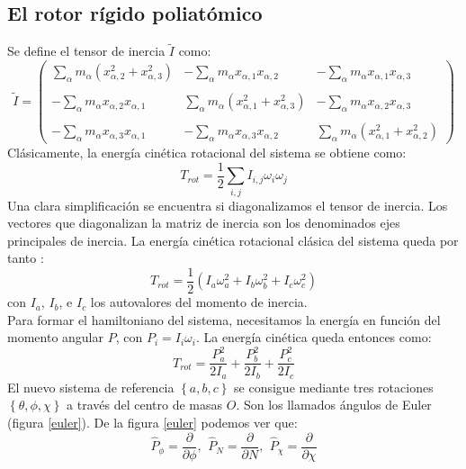 \documentclass[a4paper]{article}
\begin{document}
\subsection{El rotor rígido poliatómico}
Se define el tensor de inercia $\tilde{I}$ como:
\begin{equation}
\tilde{I}=\begin{pmatrix}
\sum_{\alpha}m_{\alpha}\left(x^2_{\alpha,2}+x^2_{\alpha,3}\right) & -\sum_{\alpha}m_{\alpha}x_{\alpha,1}x_{\alpha,2} & -\sum_{\alpha}m_{\alpha}x_{\alpha,1}x_{\alpha,3} \\\\
-\sum_{\alpha}m_{\alpha}x_{\alpha,2}x_{\alpha,1} & \sum_{\alpha}m_{\alpha}\left(x^2_{\alpha,1}+x^2_{\alpha,3}\right) &-\sum_{\alpha}m_{\alpha}x_{\alpha,2}x_{\alpha,3} \\\\
-\sum_{\alpha}m_{\alpha}x_{\alpha,3}x_{\alpha,1} & -\sum_{\alpha}m_{\alpha}x_{\alpha,3}x_{\alpha,2} & \sum_{\alpha}m_{\alpha}\left(x^2_{\alpha,1}+x^2_{\alpha,2}\right) \end{pmatrix}
\end{equation}
Clásicamente, la energía cinética rotacional del sistema se obtiene como:
\begin{equation}
T_{rot}=\frac{1}{2}\sum_{i,j}I_{i,j}\omega_i\omega_j
\end{equation}
Una clara simplificación se encuentra si diagonalizamos el tensor de inercia. Los vectores que diagonalizan la matriz de inercia son los denominados ejes principales de inercia. La energía cinética rotacional clásica del sistema queda por tanto \cite{marion2013}:
\begin{equation}
T_{rot}=\frac{1}{2}\left(I_a\omega^2_a + I_b\omega^2_b + I_c\omega^2_c\right) 
\end{equation}
con $I_a$, $I_b$, e $I_c$ los autovalores del momento de inercia.\\
Para formar el hamiltoniano del sistema, necesitamos la energía en función del momento angular $P$, con $P_i=I_i\omega_i$.
La energía cinética queda entonces como:
\begin{equation}
T_{rot}=\frac{P_a^2}{2I_a}+\frac{P_b^2}{2I_b}+\frac{P_c^2}{2I_c}
\end{equation}
El nuevo sistema de referencia $\left\lbrace a,b,c \right\rbrace$ se consigue mediante tres rotaciones  $\left\lbrace \theta,\phi,\chi \right\rbrace$ a través del centro de masas $O$. Son los llamados ángulos de Euler (figura \ref{euler}).
De la figura \ref{euler} podemos ver que:
\begin{equation}
\hat P_{\phi}=\frac{\partial}{\partial \phi},\,\ \hat P_{N}=\frac{\partial}{\partial N},\,\ \hat P_{\chi}=\frac{\partial}{\partial \chi}
\end{equation}
\end{document}
